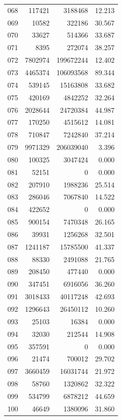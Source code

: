 \documentclass[anonymous,notoc]{gmcm2026}
\begin{document}
\begin{longtable}{lrrr}
068 & 117421 & 3188468 & 12.213 \\
069 & 10582 & 322186 & 30.567 \\
070 & 33627 & 514366 & 33.687 \\
071 & 8395 & 272074 & 38.257 \\
072 & 7802974 & 199672244 & 12.402 \\
073 & 4465374 & 106093568 & 89.344 \\
074 & 539145 & 15163808 & 33.682 \\
075 & 420169 & 4842252 & 32.264 \\
076 & 2028644 & 24720384 & 44.987 \\
077 & 170250 & 4515612 & 14.081 \\
078 & 710847 & 7242840 & 37.214 \\
079 & 9971329 & 206039040 & 3.396 \\
080 & 100325 & 3047424 & 0.000 \\
081 & 52151 & 0 & 0.000 \\
082 & 207910 & 1988236 & 25.514 \\
083 & 286046 & 7067840 & 14.522 \\
084 & 422652 & 0 & 0.000 \\
085 & 900154 & 7470348 & 26.165 \\
086 & 39931 & 1256268 & 32.501 \\
087 & 1241187 & 15785500 & 41.337 \\
088 & 88330 & 2491088 & 21.765 \\
089 & 208450 & 477440 & 0.000 \\
090 & 347451 & 6916056 & 36.260 \\
091 & 3018433 & 40117248 & 42.693 \\
092 & 1296643 & 26450112 & 10.260 \\
093 & 25103 & 16384 & 0.000 \\
094 & 32030 & 212544 & 14.908 \\
095 & 357591 & 0 & 0.000 \\
096 & 21474 & 700012 & 29.702 \\
097 & 3660459 & 16031744 & 21.972 \\
098 & 58760 & 1320862 & 32.322 \\
099 & 534799 & 6878212 & 44.659 \\
100 & 46649 & 1380096 & 31.860 \\
\end{longtable}
\end{document}
